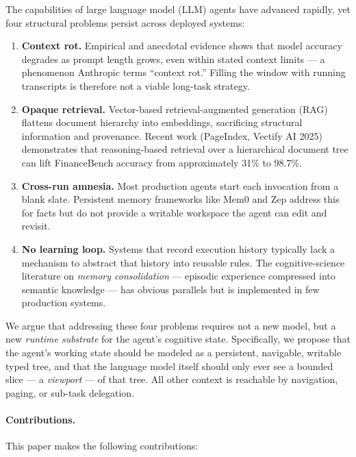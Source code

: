\documentclass[11pt,a4paper]{article}
\theoremstyle{cortexprop}
\begin{document}
The capabilities of large language model (LLM) agents have advanced rapidly,
yet four structural problems persist across deployed systems:

\begin{enumerate}
  \item \textbf{Context rot.} Empirical and anecdotal evidence shows that
  model accuracy degrades as prompt length grows, even within stated context
  limits --- a phenomenon Anthropic terms ``context rot.'' Filling the window
  with running transcripts is therefore not a viable long-task strategy.

  \item \textbf{Opaque retrieval.} Vector-based retrieval-augmented generation
  (RAG) flattens document hierarchy into embeddings, sacrificing structural
  information and provenance. Recent work (PageIndex, Vectify AI 2025)
  demonstrates that reasoning-based retrieval over a hierarchical document
  tree can lift FinanceBench accuracy from approximately 31\% to 98.7\%.

  \item \textbf{Cross-run amnesia.} Most production agents start each
  invocation from a blank slate. Persistent memory frameworks like Mem0 and
  Zep address this for facts but do not provide a writable workspace the
  agent can edit and revisit.

  \item \textbf{No learning loop.} Systems that record execution history
  typically lack a mechanism to abstract that history into reusable rules.
  The cognitive-science literature on \textit{memory consolidation} ---
  episodic experience compressed into semantic knowledge --- has obvious
  parallels but is implemented in few production systems.
\end{enumerate}

We argue that addressing these four problems requires not a new model, but a
new \textit{runtime substrate} for the agent's cognitive state. Specifically,
we propose that the agent's working state should be modeled as a persistent,
navigable, writable typed tree, and that the language model itself should
only ever see a bounded slice --- a \textit{viewport} --- of that tree. All
other context is reachable by navigation, paging, or sub-task delegation.

\paragraph{Contributions.} This paper makes the following contributions:
\end{document}
